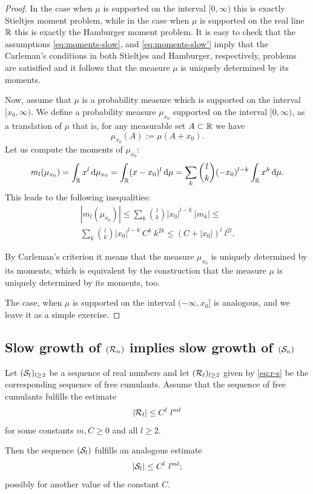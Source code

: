 \documentclass[12pt,usenames,dvipsnames,svgnames,table]{amsart}
\begin{document}
\begin{proof}
	In the case when $\mu$ is supported on the interval $[0,\infty)$ this is exactly
	Stieltjes moment problem, while in the case when $\mu$ is supported on
	the real line $\mathbb{R}$ this is exactly the Hamburger moment problem.
	It is easy to check that the assumptions \eqref{eq:moments-slow}, and \eqref{eq:moments-slow'}
	imply that the Carleman's conditions in both Stieltjes and Hamburger,
	respectively, problems are satisified and it follows that the measure $\mu$ is uniquely
	determined by its moments.
	
	Now, assume that $\mu$ is a probability measure which is supported on
	the interval $[x_0,\infty)$. We define a probability measure $\mu_{x_0}$ supported on
	the interval $[0,\infty)$, as a translation of $\mu$ that is,
	for any measurable set $A \subset \mathbb{R}$ we have
	\[ \mu_{x_0}(A) := \mu(A+x_0).\]
	Let us compute the moments of $\mu_{x_0}$:
	\[ m_l(\mu_{x_0}) = \int_\R x^l \dif\mu_{x_0} = \int_\R (x-x_0)^l \dif\mu =
	\sum_{k}\binom{l}{k}(-x_0)^{l-k}\int_\R x^k \dif\mu.\]
	This leads to the following inequalities:
	\begin{multline*} \left|m_l(\mu_{x_0}) \right| \leq \sum_{k}\binom{l}{k}|x_0|^{l-k}\ |m_k|
	\leq \\
	\sum_{k}\binom{l}{k}|x_0|^{l-k}\ C^k\ k^{2k} \leq
	(C+|x_0|)^l\ l^{2l}.
	\end{multline*}
	
	By Carleman's criterion it means that the measure $\mu_{x_0}$ is uniquely
	determined by its moments, which is equivalent by the construction
	that the measure $\mu$ is uniquely
	determined by its moments, too. 
	
	The case, when $\mu$ is supported on the interval $(-\infty,x_0]$ is
	analogous, and we leave it as a simple exercise.
\end{proof}

\subsection{Slow growth of $(\mathcal{R}_n)$ implies slow growth of $(\mathcal{S}_n)$}
\begin{lemma}
	\label{lem:small-free}
	Let $(\mathcal{S}_l)_{l\geq 2}$ be a sequence of real numbers
	and let $(\mathcal{R}_l)_{l\geq 2}$ given by \eqref{eq:r-s}
	be the corresponding sequence of free cumulants.
	Assume that the sequence of free cumulants fulfills the estimate
	\begin{equation}
	\label{eq:free-are-small}
	| \mathcal{R}_l | \leq C^l\ l^{ml}    
	\end{equation}
	for some constants $m,C\geq 0$ and all $l\geq 2$.
	
	Then the sequence $(\mathcal{S}_l)$ fulfills an analogous 
	estimate 
	\begin{equation}
	\label{eq:free-are-smallS}
	| \mathcal{S}_l | \leq C^l\ l^{ml};    
	\end{equation}
	possibly for another value of the constant $C$.
\end{lemma}
\end{document}
